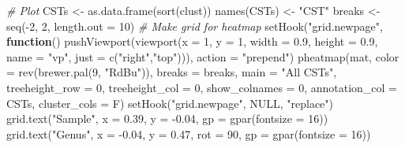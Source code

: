 \documentclass[
  oneside]{book}
\newenvironment{Shaded}{\begin{snugshade}}{\end{snugshade}}
\newcommand{\AttributeTok}[1]{\textcolor[rgb]{0.77,0.63,0.00}{#1}}
\newcommand{\CommentTok}[1]{\textcolor[rgb]{0.56,0.35,0.01}{\textit{#1}}}
\newcommand{\ConstantTok}[1]{\textcolor[rgb]{0.00,0.00,0.00}{#1}}
\newcommand{\ControlFlowTok}[1]{\textcolor[rgb]{0.13,0.29,0.53}{\textbf{#1}}}
\newcommand{\DecValTok}[1]{\textcolor[rgb]{0.00,0.00,0.81}{#1}}
\newcommand{\FloatTok}[1]{\textcolor[rgb]{0.00,0.00,0.81}{#1}}
\newcommand{\FunctionTok}[1]{\textcolor[rgb]{0.00,0.00,0.00}{#1}}
\newcommand{\NormalTok}[1]{#1}
\newcommand{\OtherTok}[1]{\textcolor[rgb]{0.56,0.35,0.01}{#1}}
\newcommand{\SpecialCharTok}[1]{\textcolor[rgb]{0.00,0.00,0.00}{#1}}
\newcommand{\StringTok}[1]{\textcolor[rgb]{0.31,0.60,0.02}{#1}}
\begin{document}
\begin{Shaded}
\begin{Highlighting}[]
\CommentTok{\# Plot}
\NormalTok{CSTs        }\OtherTok{\textless{}{-}} \FunctionTok{as.data.frame}\NormalTok{(}\FunctionTok{sort}\NormalTok{(clust))}
\FunctionTok{names}\NormalTok{(CSTs) }\OtherTok{\textless{}{-}} \StringTok{"CST"}
\NormalTok{breaks }\OtherTok{\textless{}{-}} \FunctionTok{seq}\NormalTok{(}\SpecialCharTok{{-}}\DecValTok{2}\NormalTok{, }\DecValTok{2}\NormalTok{, }\AttributeTok{length.out =} \DecValTok{10}\NormalTok{)}
\CommentTok{\# Make grid for heatmap}
\FunctionTok{setHook}\NormalTok{(}\StringTok{"grid.newpage"}\NormalTok{, }\ControlFlowTok{function}\NormalTok{() }\FunctionTok{pushViewport}\NormalTok{(}\FunctionTok{viewport}\NormalTok{(}\AttributeTok{x =} \DecValTok{1}\NormalTok{, }\AttributeTok{y =} \DecValTok{1}\NormalTok{, }\AttributeTok{width =} \FloatTok{0.9}\NormalTok{, }
                                                         \AttributeTok{height =} \FloatTok{0.9}\NormalTok{, }\AttributeTok{name =} \StringTok{"vp"}\NormalTok{, }
                                                         \AttributeTok{just =} \FunctionTok{c}\NormalTok{(}\StringTok{"right"}\NormalTok{,}\StringTok{"top"}\NormalTok{))), }
        \AttributeTok{action =} \StringTok{"prepend"}\NormalTok{)}
\FunctionTok{pheatmap}\NormalTok{(mat, }\AttributeTok{color =} \FunctionTok{rev}\NormalTok{(}\FunctionTok{brewer.pal}\NormalTok{(}\DecValTok{9}\NormalTok{, }\StringTok{"RdBu"}\NormalTok{)), }\AttributeTok{breaks =}\NormalTok{ breaks, }\AttributeTok{main =} \StringTok{"All CSTs"}\NormalTok{, }\AttributeTok{treeheight\_row =} \DecValTok{0}\NormalTok{, }\AttributeTok{treeheight\_col =} \DecValTok{0}\NormalTok{, }\AttributeTok{show\_colnames =} \DecValTok{0}\NormalTok{, }\AttributeTok{annotation\_col =}\NormalTok{ CSTs, }\AttributeTok{cluster\_cols =}\NormalTok{ F)}
\FunctionTok{setHook}\NormalTok{(}\StringTok{"grid.newpage"}\NormalTok{, }\ConstantTok{NULL}\NormalTok{, }\StringTok{"replace"}\NormalTok{)}
\FunctionTok{grid.text}\NormalTok{(}\StringTok{"Sample"}\NormalTok{, }\AttributeTok{x =} \FloatTok{0.39}\NormalTok{, }\AttributeTok{y =} \SpecialCharTok{{-}}\FloatTok{0.04}\NormalTok{, }\AttributeTok{gp =} \FunctionTok{gpar}\NormalTok{(}\AttributeTok{fontsize =} \DecValTok{16}\NormalTok{))}
\FunctionTok{grid.text}\NormalTok{(}\StringTok{"Genus"}\NormalTok{, }\AttributeTok{x =} \SpecialCharTok{{-}}\FloatTok{0.04}\NormalTok{, }\AttributeTok{y =} \FloatTok{0.47}\NormalTok{, }\AttributeTok{rot =} \DecValTok{90}\NormalTok{, }\AttributeTok{gp =} \FunctionTok{gpar}\NormalTok{(}\AttributeTok{fontsize =} \DecValTok{16}\NormalTok{))}
\end{Highlighting}
\end{Shaded}
\end{document}

